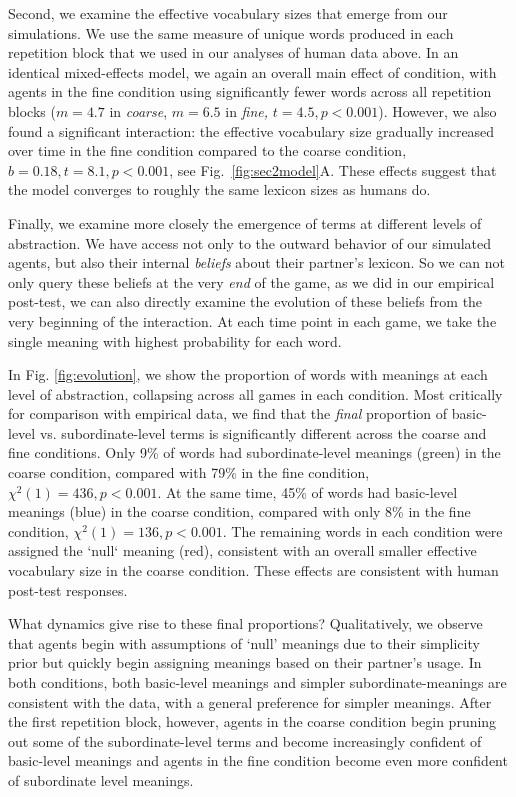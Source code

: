 Second, we examine the effective vocabulary sizes that emerge from our simulations. 
We use the same measure of unique words produced in each repetition block that we used in our analyses of human data above. 
In an identical mixed-effects model, we again an overall main effect of condition, with agents in the fine condition using significantly fewer words across all repetition blocks ($m = 4.7$ in \emph{coarse}, $m=6.5$ in \emph{fine,} $t = 4.5, p < 0.001$).
However, we also found a significant interaction: the effective vocabulary size gradually increased over time in the fine condition compared to the coarse condition, $b = 0.18, t = 8.1, p < 0.001$, see Fig.~\ref{fig:sec2model}A.
These effects suggest that the model converges to roughly the same lexicon sizes as humans do.

Finally, we examine more closely the emergence of terms at different levels of abstraction.
We have access not only to the outward behavior of our simulated agents, but also their internal \emph{beliefs} about their partner's lexicon.
So we can not only query these beliefs at the very \emph{end} of the game, as we did in our empirical post-test, we can also directly examine the evolution of these beliefs from the very beginning of the interaction.
At each time point in each game, we take the single meaning with highest probability for each word.

In Fig. \ref{fig:evolution}, we show the proportion of words with meanings at each level of abstraction, collapsing across all games in each condition.
Most critically for comparison with empirical data, we find that the \emph{final} proportion of basic-level vs. subordinate-level terms is significantly different across the coarse and fine conditions.
Only 9\% of words had subordinate-level meanings (green) in the coarse condition, compared with 79\% in the fine condition, $\chi^2(1) = 436, p < 0.001$.
At the same time, 45\% of words had basic-level meanings (blue) in the coarse condition, compared with only 8\% in the fine condition, $\chi^2(1) = 136, p < 0.001$.
The remaining words in each condition were assigned the `null` meaning (red), consistent with an overall smaller effective vocabulary size in the coarse condition.
These effects are consistent with human post-test responses.

What dynamics give rise to these final proportions?
Qualitatively, we observe that agents begin with assumptions of `null' meanings due to their simplicity prior but quickly begin assigning meanings based on their partner's usage.
In both conditions, both basic-level meanings and simpler subordinate-meanings are consistent with the data, with a general preference for simpler meanings.
After the first repetition block, however, agents in the coarse condition begin pruning out some of the subordinate-level terms and become increasingly confident of basic-level meanings and agents in the fine condition become even more confident of subordinate level meanings. 



